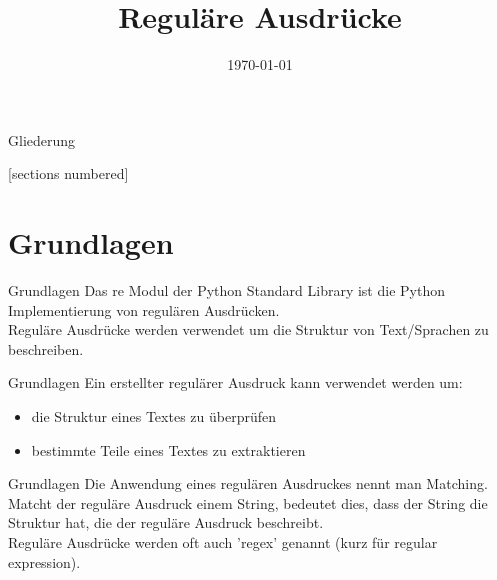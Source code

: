 



\title{Regul\"are Ausdr\"ucke}
\date{\today}




\maketitle

\begin{frame}{Gliederung}
        \begin{multicols}{2}
                [sections numbered]
                \tableofcontents
        \end{multicols}
\end{frame}

\section{Grundlagen}
\begin{frame}{Grundlagen}
	Das \alert{re} Modul der Python Standard Library ist die Python Implementierung von regulären Ausdrücken.\\[.25cm]
	Reguläre Ausdrücke werden verwendet um die Struktur von Text/Sprachen zu beschreiben.
\end{frame}

\begin{frame}{Grundlagen}
	Ein erstellter regul\"arer Ausdruck kann verwendet werden um:
	\begin{itemize}
		\item die Struktur eines Textes zu \"uberpr\"ufen
		\item bestimmte Teile eines Textes zu extraktieren
	\end{itemize}
\end{frame}

\begin{frame}{Grundlagen}
	Die Anwendung eines regulären Ausdruckes nennt man Matching.\\[.25cm]
Matcht der reguläre Ausdruck einem String, bedeutet dies, dass der String die Struktur hat, die der reguläre Ausdruck beschreibt.\\[.25cm]
Reguläre Ausdrücke werden oft auch 'regex' genannt (kurz für \alert{regular expression}).
\end{frame}


